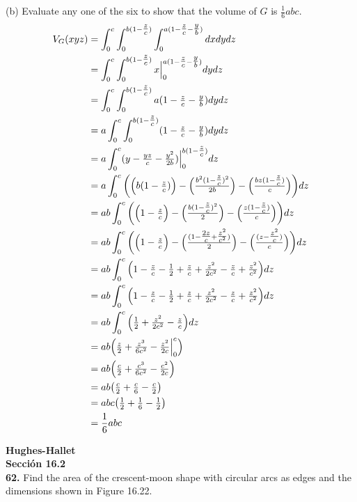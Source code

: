 \documentclass[11pt]{report}
\begin{document}
(b) Evaluate any one of the six to show that the volume of $G$ is $\tfrac{1}{6} abc$. \\
\begin{equation}
	\begin{split}
		V_G(xyz)&=\int_0^{c}\int_0^{b(1-\tfrac{z}{c})}\int_0^{a(1-\tfrac{z}{c}-\tfrac{y}{b})}dxdydz\\
				&=\int_0^{c}\int_0^{b(1-\tfrac{z}{c})}x\Big|_0^{a(1-\tfrac{z}{c}-\tfrac{y}{b})}dydz\\
				&=\int_0^{c}\int_0^{b(1-\tfrac{z}{c})}a(1-\tfrac{z}{c}-\tfrac{y}{b})dydz\\
				&=a\int_0^{c}\int_0^{b(1-\tfrac{z}{c})}(1-\tfrac{z}{c}-\tfrac{y}{b})dydz\\
				&=a\int_0^{c}(y-\tfrac{yz}{c}-\tfrac{y^2}{2b})\Big|_0^{b(1-\tfrac{z}{c})}dz\\
				&=a\int_0^{c}\bigg( \Big( b(1-\tfrac{z}{c}) \Big)-\Big( \tfrac{b^2(1-\tfrac{z}{c})^2}{2b} \Big)-
					\Big( \tfrac{bz(1-\tfrac{z}{c})}{c} \Big) \bigg)dz\\
				&=ab\int_0^{c}\bigg( \Big( 1-\tfrac{z}{c} \Big)-\Big( \tfrac{b(1-\tfrac{z}{c})^2}{2} \Big)-
					\Big( \tfrac{z(1-\tfrac{z}{c})}{c} \Big) \bigg)dz\\
				&=ab\int_0^{c}\bigg( \Big( 1-\tfrac{z}{c} \Big)-\Big( \tfrac{(1-\tfrac{2z}{c}+\tfrac{z^2}{c^2})}{2} \Big)-
					\Big( \tfrac{(z-\tfrac{z^2}{c})}{c} \Big) \bigg)dz\\
				&=ab\int_0^{c}\Big( 1-\tfrac{z}{c}-\tfrac{1}{2}+\tfrac{z}{c}+\tfrac{z^2}{2c^2}-
					\tfrac{z}{c}+\tfrac{z^2}{c^2} \Big)dz\\
				&=ab\int_0^{c}\Big( 1-\tfrac{z}{c}-\tfrac{1}{2}+\tfrac{z}{c}+\tfrac{z^2}{2c^2}-
					\tfrac{z}{c}+\tfrac{z^2}{c^2} \Big)dz\\
				&=ab\int_0^{c}\Big( \tfrac{1}{2}+\tfrac{z^2}{2c^2}-\tfrac{z}{c} \Big)dz\\
				&=ab\Big( \tfrac{z}{2}+\tfrac{z^3}{6c^2}-\tfrac{z^2}{2c}\Big|_0^c \Big)\\
				&=ab\Big( \tfrac{c}{2}+\tfrac{c^3}{6c^2}-\tfrac{c^2}{2c} \Big)\\
				&=ab\big( \tfrac{c}{2}+\tfrac{c}{6}-\tfrac{c}{2} \big)\\
				&=abc\big( \tfrac{1}{2}+\tfrac{1}{6}-\tfrac{1}{2} \big)\\
				&=\frac{1}{6}abc\\
	\end{split}
\end{equation}

\textbf{Hughes-Hallet} \\

\textbf{Sección 16.2}\\
\textbf{62.} Find the area of the crescent-moon shape with circular arcs as edges
and the dimensions shown in Figure 16.22. \\
\end{document}
